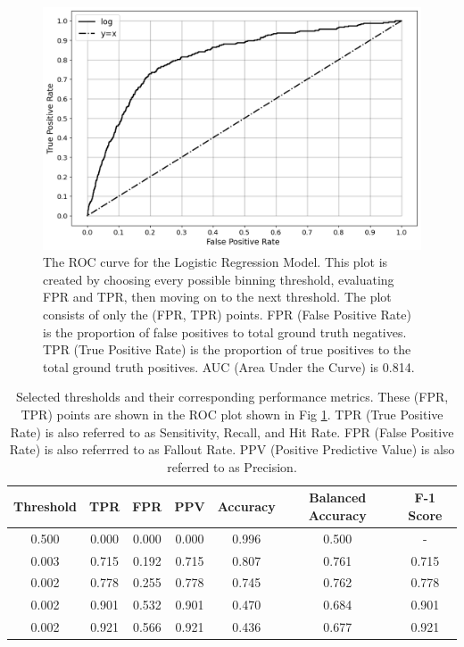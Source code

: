 \documentclass[10pt,letterpaper]{article}
\begin{document}
\begin{figure}[htb]
    \centering
    \includegraphics[width=\textwidth]{../img/ROC.png}
    \caption[ROC curve]{The ROC curve for the Logistic Regression Model. This plot is created by choosing every possible binning threshold, evaluating FPR and TPR, then moving on to the next threshold. The plot consists of only the (FPR, TPR) points. FPR (False Positive Rate) is the proportion of false positives to total ground truth negatives. TPR (True Positive Rate) is the proportion of true positives to the total ground truth positives. AUC (Area Under the Curve) is 0.814.}
    \label{fig:ROC}
\end{figure}

\begin{table}[htb]
    \centering
    \begin{tabular}{ccccccc}
        \toprule
        Threshold &   TPR &   FPR & PPV & Accuracy &  Balanced Accuracy & F-1 Score \\
        \midrule
        0.500 & 0.000 & 0.000 & 0.000 &     0.996 &     0.500 &   - \\
        0.003 & 0.715 & 0.192 & 0.715 &     0.807 &     0.761 & 0.715 \\
        0.002 & 0.778 & 0.255 & 0.778 &     0.745 &     0.762 & 0.778 \\
        0.002 & 0.901 & 0.532 & 0.901 &     0.470 &     0.684 & 0.901 \\
        0.002 & 0.921 & 0.566 & 0.921 &     0.436 &     0.677 & 0.921 \\
        \bottomrule
    \end{tabular}
    \caption{Selected thresholds and their corresponding performance metrics. These (FPR, TPR) points are shown in the ROC plot shown in Fig \ref{fig:ROC}. TPR (True Positive Rate) is also referred to as Sensitivity, Recall, and Hit Rate. FPR (False Positive Rate) is also referrred to as Fallout Rate. PPV (Positive Predictive Value) is also referred to as Precision.}
    \label{tbl:performance}
\end{table}
\end{document}
